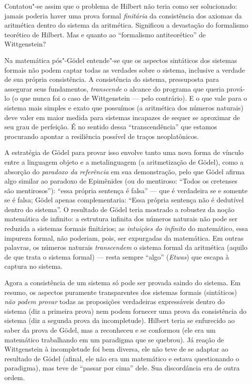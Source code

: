 {Contatou"-se assim que o problema de Hilbert não teria como
ser solucionado: jamais poderia haver uma prova formal
\emph{finitária} da consistência dos axiomas da aritmética
dentro do sistema da aritmética. Significou a devastação do
formalismo teorético de Hilbert. Mas e quanto ao
``formalismo antiteorético'' de Wittgenstein? 

Na matemática pós"-Gödel entende"-se que os aspectos sintáticos
dos sistemas formais não podem captar todas as verdades sobre o
sistema, inclusive a verdade de sua própria consistência. A
consistência do sistema, pressuposta para assegurar seus
fundamentos, \emph{transcende} o alcance do programa que
queria prová-lo (o que nunca foi o caso de Wittgenstein --- pelo
contrário). E o que vale para o sistema mais simples e exato que
possuímos (a aritmética dos números naturais) deve valer em
maior medida para sistemas incapazes de sequer se aproximar de
seu grau de perfeição. É no sentido dessa
``transcendência'' que estamos
procurando apontar a resiliência possível de traços
neoplatônicos.

A estratégia de Gödel para provar isso envolve tanto uma nova
forma de vínculo entre a linguagem objeto e a metalinguagem (a
aritmetização de Gödel), como a absorção do \emph{paradoxo da
referência} em sua demonstração, pelo que Gödel afirma algo
similar ao paradoxo de Epimênides (ou do mentiroso: “Todos os
cretenses são mentirosos”): “essa própria sentença é falsa” ---
que é verdadeira se e somente se é falsa; Gödel apenas
complementaria: “Essa própria sentença não é dedutível dentro do
sistema”. O resultado de Gödel teria mostrado a robustez da
noção matemática de infinito: a estrutura infinita dos números
naturais não pode ser reduzida a sistemas formais finitários; as
\emph{intuições do infinito} do matemático, essa impureza
formal, não poderiam, pois, ser expurgadas da matemática. Em
outras palavras, os números naturais \emph{transcendem} o
sistema formal da aritmética (aquilo de que trata o sistema
formal) --- resta sempre ``algo''
(\emph{Etwas}) que escapa à captura no sistema.

Agora a consistência de um sistema só pode ser provada saindo do
sistema. Em resumo, os aspectos puramente transparentes dos
sistemas formais (sintáticos) \emph{não podem provar} todas as
proposições verdadeiras expressáveis dentro do sistema (diz a
primeira prova) nem podem fornecer uma prova da consistência do
sistema (diz a segunda prova da incompletude). Hilbert teria se
enfurecido ao saber da prova de Gödel, mas a reconheceu e se
conformou (ele era um matemático trabalhando em um paradigma que
se quebrou). Já reação de Wittgenstein à incompletude foi bem
diversa, ele não teve de se adaptar ao resultado de Gödel
(afinal, ele não era um matemático e estava questionando o
paradigma), mas teve de “passar por cima” dele. Sua discordância
era de outra ordem.

}
